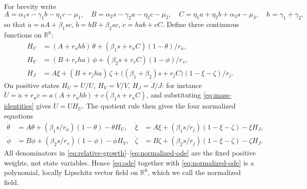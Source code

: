 \documentclass[11pt,a4paper]{article}
\theoremstyle{plain}
\theoremstyle{definition}
\theoremstyle{remark}
\newcommand{\R}{\mathbb R}
\begin{document}
For brevity write
\[
 A=\alpha_1s-\gamma_1b-\eta_1c-\mu_1,\quad
 B=\alpha_2s-\gamma_2a-\eta_2c-\mu_2,\quad
 C=\eta_1a+\eta_2b+\alpha_3s-\mu_3,\quad h=\gamma_1+\gamma_2,
\]
so that $\dot a=aA+\beta_1sc$, $\dot b=bB+\beta_2sc$, $\dot c=hab+cC$. Define three continuous functions on $\R^8$:
\begin{equation}\label{eq:relative-growth}
\begin{aligned}
 H_U&=(A+r_uhb)\,\theta+(\beta_1s+r_uC)(1-\theta)/r_u,\\
 H_V&=(B+r_vha)\,\phi+(\beta_2s+r_vC)(1-\phi)/r_v,\\
 H_J&=A\xi+(B+r_jha)\,\zeta+\bigl((\beta_1+\beta_2)s+r_jC\bigr)(1-\xi-\zeta)/r_j .
\end{aligned}
\end{equation}
On positive states $H_U=\dot U/U$, $H_V=\dot V/V$, $H_J=\dot J/J$: for instance $\dot U=\dot a+r_u\dot c=a(A+r_uhb)+c(\beta_1s+r_uC)$, and substituting \eqref{eq:mass-identities} gives $\dot U=UH_U$. The quotient rule then gives the four normalized equations
\begin{equation}\label{eq:normalized-ode}
\begin{aligned}
 \dot\theta&=A\theta+(\beta_1s/r_u)(1-\theta)-\theta H_U,&
 \dot\xi&=A\xi+(\beta_1s/r_j)(1-\xi-\zeta)-\xi H_J,\\
 \dot\phi&=B\phi+(\beta_2s/r_v)(1-\phi)-\phi H_V,&
 \dot\zeta&=B\zeta+(\beta_2s/r_j)(1-\xi-\zeta)-\zeta H_J .
\end{aligned}
\end{equation}
All denominators in \eqref{eq:relative-growth}--\eqref{eq:normalized-ode} are the fixed positive weights, not state variables. Hence \eqref{eq:ode} together with \eqref{eq:normalized-ode} is a polynomial, locally Lipschitz vector field on $\R^8$, which we call the normalized field.
\end{document}
